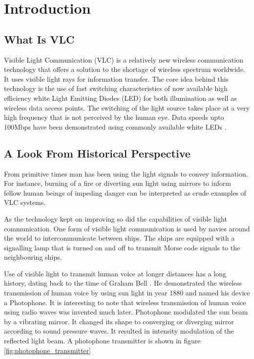 
\chapter{Introduction} %
\label{Chapter1}

\section{What Is VLC}
Visible Light Communication (VLC) is a relatively new wireless communication technology that offers a solution to the shortage of wireless spectrum worldwide. It uses visible light rays for information transfer. The core idea behind this technology is the use of fast switching characteristics of now available high efficiency white Light Emitting Diodes (LED) for both illumination as well as wireless data access points. The switching of the light source takes place at a very high frequency that is not perceived by the human eye. Data speeds upto 100Mbps have been demonstrated using commonly available white LEDs  \cite{le2009100}.

\section{A Look From Historical Perspective}
From primitive times man has been using the light signals to convey information. For instance, burning of a fire or diverting sun light using mirrors \cite{webber1875discussion} to inform fellow human beings of impeding danger can be interpreted as crude examples of VLC systems.

As the technology kept on improving so did the capabilities of visible light communication. One form of visible light communication is used by navies around the world to intercommunicate between ships. The ships are equipped with a signalling lamp that is turned on and off to transmit Morse code signals to the neighbouring ships.

Use of visible light to transmit human voice at longer distances has a long history, dating back to the time of Graham Bell \cite{bell1880photo}. He demonstrated the wireless transmission of human voice by using sun light in year 1880 and named his device a Photophone. It is interesting to note that wireless transmission of human voice using radio waves was invented much later. Photophone modulated the sun beam by a vibrating mirror.  It  changed its shape to converging or diverging mirror according to sound pressure waves. It resulted in intensity modulation of the reflected light beam. A photophone transmitter is shown in figure \ref{fig:photophone_transmitter}

